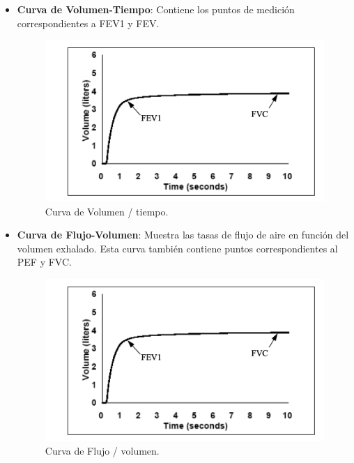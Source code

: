 \documentclass[12pt]{article}
\begin{document}
\begin{itemize}
    \item \textbf{Curva de Volumen-Tiempo}: Contiene los puntos de medición correspondientes a FEV1 y FEV.
        \begin{figure}[ht]
        \centering
        \includegraphics[scale=0.45]{imag/volumentiempo.png}
        \caption{Curva de Volumen / tiempo. }
        \label{4}
        \end{figure}
        \FloatBarrier

    
    \item \textbf{Curva de Flujo-Volumen}: Muestra las tasas de flujo de aire en función del volumen exhalado. Esta curva también contiene puntos correspondientes al PEF y FVC.
    
        \begin{figure}[ht]
        \centering
        \includegraphics[scale=0.45]{imag/volumentiempo.png}
        \caption{Curva de Flujo / volumen. }
        \label{4}
        \end{figure}
        \FloatBarrier
    
    
\end{itemize}
\end{document}
